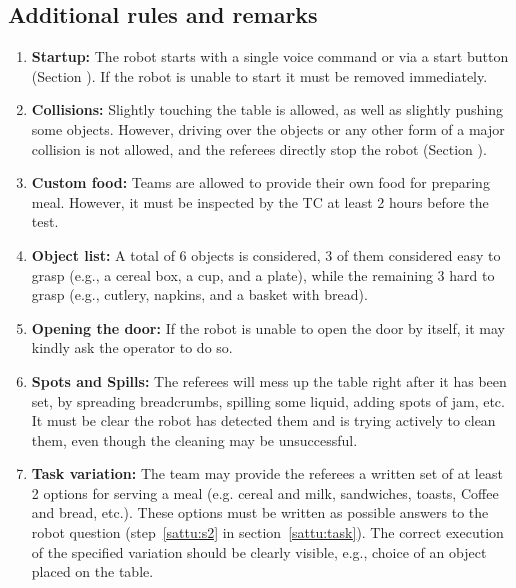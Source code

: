 \subsection{Additional rules and remarks}
\label{sattu:add}
\begin{enumerate}
	\item \textbf{Startup:} The robot starts with a single voice command or via a start button (Section ). If the robot is unable to start it must be removed immediately.

	\item \textbf{Collisions:} Slightly touching the table is allowed, as well as slightly pushing some objects. However, driving over the objects or any other form of a major collision is not allowed, and the referees directly stop the robot (Section ).

	\item \textbf{Custom food:} Teams are allowed to provide their own food for preparing meal. However, it must be inspected by the TC at least 2 hours before the test.

	\item \textbf{Object list:} A total of 6 objects is considered, 3 of them considered easy to grasp (e.g., a cereal box, a cup, and a plate), while the remaining 3 hard to grasp (e.g., cutlery, napkins, and a basket with bread).

	\item \textbf{Opening the door:} If the robot is unable to open the door by itself, it may kindly ask the operator to do so.

	\item \textbf{Spots and Spills:} The referees will mess up the table right after it has been set, by spreading breadcrumbs, spilling some liquid, adding spots of jam, etc. It must be clear the robot has detected them and is trying actively to clean them, even though the cleaning may be unsuccessful.

	\item \textbf{Task variation:} The team may provide the referees a written set of at least 2 options for serving a meal (e.g. cereal and milk, sandwiches, toasts, Coffee and bread, etc.). These options must be written as possible answers to the robot question (step~\ref{sattu:s2} in section~\ref{sattu:task}). The correct execution of the specified variation should be clearly visible, e.g., choice of an object placed on the table.
\end{enumerate}

